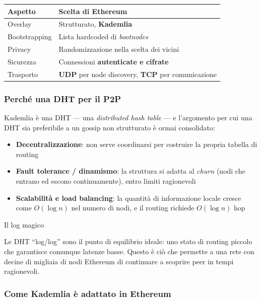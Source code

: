\documentclass[
  italian,
  openany]{book}
\newcounter{none} %
\providecommand{\tightlist}{%
  \setlength{\itemsep}{0pt}\setlength{\parskip}{0pt}}
\begin{document}
{\def\LTcaptype{none} %
\begin{longtable}[]{@{}ll@{}}
\toprule\noalign{}
Aspetto & Scelta di Ethereum \\
\midrule\noalign{}
\endhead
\bottomrule\noalign{}
\endlastfoot
Overlay & Strutturato, \textbf{Kademlia} \\
Bootstrapping & Lista hardcoded di \emph{bootnodes} \\
Privacy & Randomizzazione nella scelta dei vicini \\
Sicurezza & Connessioni \textbf{autenticate e cifrate} \\
Trasporto & \textbf{UDP} per node discovery, \textbf{TCP} per
comunicazione \\
\end{longtable}
}

\subsubsection{Perché una DHT per il
P2P}\label{perchuxe9-una-dht-per-il-p2p}

Kademlia è una DHT --- una \emph{distributed hash table} --- e
l'argomento per cui una DHT sia preferibile a un gossip non strutturato
è ormai consolidato:

\begin{itemize}
\tightlist
\item
  \textbf{Decentralizzazione}: non serve coordinarsi per costruire la
  propria tabella di routing
\item
  \textbf{Fault tolerance / dinamismo}: la struttura si adatta al
  \emph{churn} (nodi che entrano ed escono continuamente), entro limiti
  ragionevoli
\item
  \textbf{Scalabilità e load balancing}: la quantità di informazione
  locale cresce come \(O(\log n)\) nel numero di nodi, e il routing
  richiede \(O(\log n)\) hop
\end{itemize}

\begin{callouttip}{Il log magico}

Le DHT ``log/log'' sono il punto di equilibrio ideale: uno stato di
routing piccolo che garantisce comunque latenze basse. Questo è ciò che
permette a una rete con decine di migliaia di nodi Ethereum di
continuare a scoprire peer in tempi ragionevoli.

\end{callouttip}

\subsubsection{Come Kademlia è adattato in
Ethereum}\label{come-kademlia-uxe8-adattato-in-ethereum}
\end{document}
